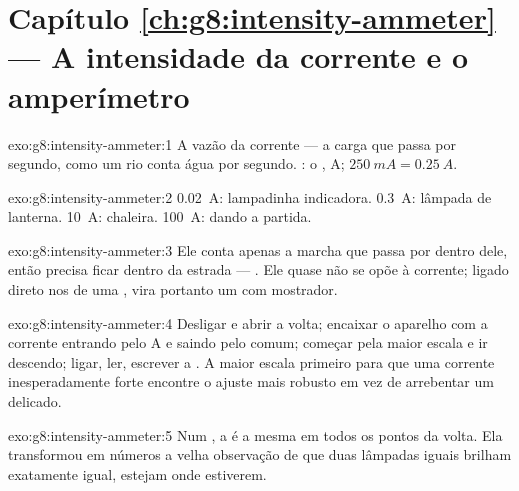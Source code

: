 \section*{Capítulo \ref{ch:g8:intensity-ammeter} --- A intensidade da corrente e o amperímetro}

\begin{solution}{exo:g8:intensity-ammeter:1}
A vazão da corrente --- a carga que passa por segundo, como um rio
conta água por segundo. : o , \unit{A};
$\qty{250}{mA} = \qty{0.25}{A}$.
\end{solution}

\begin{solution}{exo:g8:intensity-ammeter:2}
\qty{0.02}{A}: lampadinha indicadora. \qty{0.3}{A}: lâmpada de
lanterna. \qty{10}{A}: chaleira. \qty{100}{A}:  dando a partida.
\end{solution}

\begin{solution}{exo:g8:intensity-ammeter:3}
Ele conta apenas a marcha que passa por dentro dele, então precisa
ficar dentro da estrada --- . Ele quase não se opõe à
corrente; ligado direto nos  de uma , vira portanto um
 com mostrador.
\end{solution}

\begin{solution}{exo:g8:intensity-ammeter:4}
Desligar e abrir a volta; encaixar o aparelho com a corrente entrando
pelo  \unit{A} e saindo pelo comum; começar pela maior escala
e ir descendo; ligar, ler, escrever a . A maior escala
primeiro para que uma corrente inesperadamente forte encontre o ajuste
mais robusto em vez de arrebentar um delicado.
\end{solution}

\begin{solution}{exo:g8:intensity-ammeter:5}
Num , a  é a mesma em todos os pontos da
volta. Ela transformou em números a velha observação de que duas
lâmpadas iguais  brilham exatamente igual, estejam onde
estiverem.
\end{solution}

